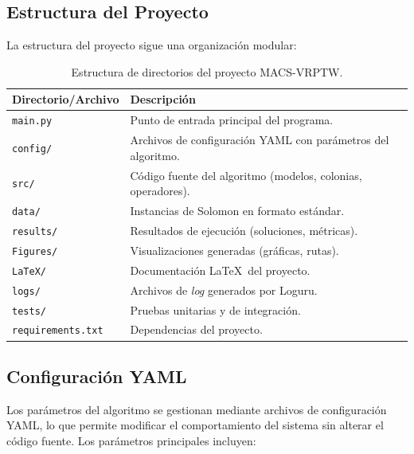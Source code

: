 \documentclass[12pt, letterpaper]{article}
\begin{document}
\subsection{Estructura del Proyecto}
\label{subsec:estructura}

La estructura del proyecto sigue una organización modular:

\begin{table}[H]
  \centering
  \caption{Estructura de directorios del proyecto MACS-VRPTW.}
  \label{tab:estructura}
  \begin{tabularx}{\textwidth}{lX}
    \toprule
    \textbf{Directorio/Archivo} & \textbf{Descripción} \\
    \midrule
    \texttt{main.py}          & Punto de entrada principal del programa. \\
    \texttt{config/}          & Archivos de configuración YAML con parámetros del algoritmo. \\
    \texttt{src/}             & Código fuente del algoritmo (modelos, colonias, operadores). \\
    \texttt{data/}            & Instancias de Solomon en formato estándar. \\
    \texttt{results/}         & Resultados de ejecución (soluciones, métricas). \\
    \texttt{Figures/}         & Visualizaciones generadas (gráficas, rutas). \\
    \texttt{LaTeX/}           & Documentación \LaTeX\ del proyecto. \\
    \texttt{logs/}            & Archivos de \textit{log} generados por Loguru. \\
    \texttt{tests/}           & Pruebas unitarias y de integración. \\
    \texttt{requirements.txt} & Dependencias del proyecto. \\
    \bottomrule
  \end{tabularx}
\end{table}

\subsection{Configuración YAML}
\label{subsec:yaml}

Los parámetros del algoritmo se gestionan mediante archivos de configuración YAML, lo que permite modificar el comportamiento del sistema sin alterar el código fuente. Los parámetros principales incluyen:
\end{document}
